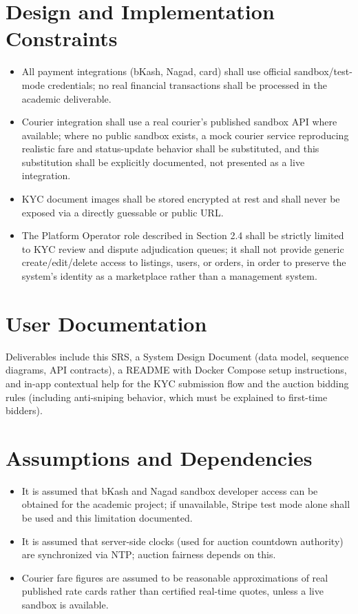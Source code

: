 \documentclass[11pt,a4paper]{report}
\begin{document}
\section{Design and Implementation Constraints}
\begin{itemize}[nosep]
    \item All payment integrations (bKash, Nagad, card) shall use official sandbox/test-mode credentials; no real financial transactions shall be processed in the academic deliverable.
    \item Courier integration shall use a real courier's published sandbox API where available; where no public sandbox exists, a mock courier service reproducing realistic fare and status-update behavior shall be substituted, and this substitution shall be explicitly documented, not presented as a live integration.
    \item KYC document images shall be stored encrypted at rest and shall never be exposed via a directly guessable or public URL.
    \item The Platform Operator role described in Section 2.4 shall be strictly limited to KYC review and dispute adjudication queues; it shall not provide generic create/edit/delete access to listings, users, or orders, in order to preserve the system's identity as a marketplace rather than a management system.
\end{itemize}

\section{User Documentation}
Deliverables include this SRS, a System Design Document (data model, sequence diagrams, API contracts), a README with Docker Compose setup instructions, and in-app contextual help for the KYC submission flow and the auction bidding rules (including anti-sniping behavior, which must be explained to first-time bidders).

\section{Assumptions and Dependencies}
\begin{itemize}[nosep]
    \item It is assumed that bKash and Nagad sandbox developer access can be obtained for the academic project; if unavailable, Stripe test mode alone shall be used and this limitation documented.
    \item It is assumed that server-side clocks (used for auction countdown authority) are synchronized via NTP; auction fairness depends on this.
    \item Courier fare figures are assumed to be reasonable approximations of real published rate cards rather than certified real-time quotes, unless a live sandbox is available.
\end{itemize}
\end{document}
